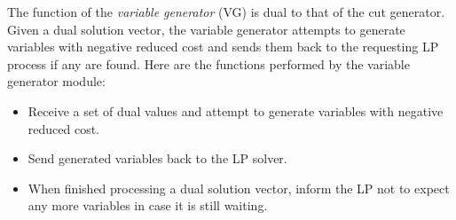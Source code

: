 The function of the {\em variable generator} (VG) is dual to that of the
cut generator. Given a dual solution vector, the variable generator
attempts to generate variables with negative reduced cost and sends
them back to the requesting LP process if any are found. Here are the
functions performed by the variable generator module:
\begin{itemize}
\item Receive a set of dual values and attempt to generate variables with
  negative reduced cost. 
\item Send generated variables back to the LP solver.   
\item When finished processing a dual solution vector, inform the
  LP not to expect any more variables in case it is still waiting.
\end{itemize}

%



